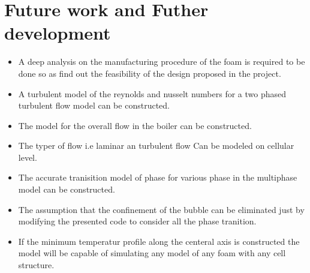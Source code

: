\documentclass[compileTAMUreport.tex]{subfiles}
\begin{document}
\section{Future work and Futher development}
\begin{itemize}
\item A deep analysis on the manufacturing procedure of the foam is required to be done so as find out the feasibility of the design proposed in the project. 

\item A turbulent model of the reynolds and nusselt numbers for a two phased turbulent flow model can be constructed.

\item The model for the overall flow in the boiler can be constructed.

\item The typer of flow i.e laminar an turbulent flow Can be modeled on cellular level. 

\item The accurate tranisition model of phase for various phase in the multiphase model can be constructed.

\item The assumption that the confinement of the bubble can be eliminated just by modifying the presented code to consider all the phase tranition.

\item If the minimum temperatur profile along the centeral axis is constructed the model will be capable of simulating any model of any foam with any cell structure. 

\end{itemize}
\end{document}
